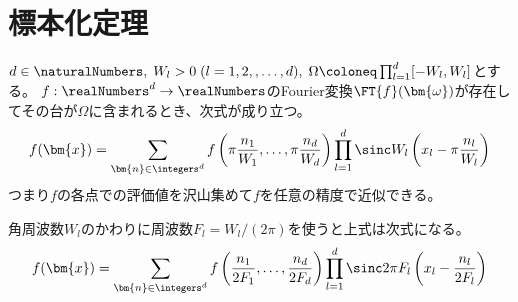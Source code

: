 \chapter{標本化定理}
    \begin{shadebox}
        $d\in\naturalNumbers,\;W_l>0\;(l=1,2,,\dots,d),\;\Omega\coloneq\prod_{l=1}^d [-W_l,W_l]$とする。
        $f:\realNumbers^d\to\realNumbers$のFourier変換$\FT{f}(\bm{\omega})$が存在してその台が$\Omega$に含まれるとき、次式が成り立つ。
        \[ f(\bm{x}) = \sum_{\bm{n}\in\integers^d}f\left(\pi\frac{n_1}{W_1},\dots,\pi\frac{n_d}{W_d}\right)\prod_{l=1}^d\sinc W_l\left(x_l - \pi\frac{n_l}{W_l}\right) \]
        つまり$f$の各点での評価値を沢山集めて$f$を任意の精度で近似できる。
        \par
        角周波数$W_l$のかわりに周波数$F_l=W_l/(2\pi)$を使うと上式は次式になる。
        \[ f(\bm{x}) = \sum_{\bm{n}\in\integers^d}f\left(\frac{n_1}{2F_1},\dots,\frac{n_d}{2F_d}\right)\prod_{l=1}^d\sinc 2\pi F_l\left(x_l - \frac{n_l}{2F_l}\right) \]
    \end{shadebox}
